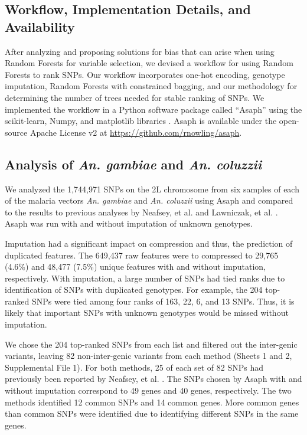 \subsection{Workflow, Implementation Details, and Availability}
After analyzing and proposing solutions for bias that can arise when using Random Forests for variable selection, we devised a workflow for using Random Forests to rank SNPs. Our workflow incorporates one-hot encoding, genotype imputation, Random Forests with constrained bagging, and our methodology for determining the number of trees needed for stable ranking of SNPs.  We implemented the workflow in a Python software package called ``Asaph'' using the scikit-learn, Numpy, and matplotlib libraries \cite{scikit-learn,Stefan2011,Hunter2007}.  Asaph is available under the open-source Apache License v2 at \url{https://github.com/rnowling/asaph}.
  
\subsection{Analysis of \emph{An. gambiae} and \emph{An. coluzzii}}
We analyzed the 1,744,971 SNPs on the 2L chromosome from six samples of each of the malaria vectors \emph{An. gambiae} and \emph{An. coluzzii} using Asaph and compared to the results to previous analyses by Neafsey, et al. \cite{Neafsey2010} and Lawniczak, et al. \cite{Lawniczak2010}. Asaph was run with and without imputation of unknown genotypes.

Imputation had a significant impact on compression and thus, the prediction of duplicated features.  The 649,437 raw features were to compressed to 29,765 (4.6\%) and 48,477 (7.5\%) unique features with and without imputation, respectively.  With imputation, a large number of SNPs had tied ranks due to identification of SNPs with duplicated genotypes.  For example, the 204 top-ranked SNPs were tied among four ranks of 163, 22, 6, and 13 SNPs.  Thus, it is likely that important SNPs with unknown genotypes would be missed without imputation.

We chose the 204 top-ranked SNPs from each list and filtered out the inter-genic variants, leaving 82 non-inter-genic variants from each method (Sheets 1 and 2, Supplemental File 1).   For both methods, 25 of each set of 82 SNPs had previously been reported by Neafsey, et al. \cite{Neafsey2010}. The SNPs chosen by Asaph with and without imputation correspond to 49 genes and 40 genes, respectively.  The two methods identified 12 common SNPs and 14 common genes.  More common genes than common SNPs were identified due to identifying different SNPs in the same genes.

